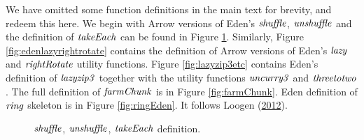 \documentclass[paper=A4,twoside=true,openright,parskip=full,chapterprefix=true,headings=normal,bibliography=totoc,listof=totoc,titlepage=on,captions=tableabove,draft=false,british]{scrreprt}%
\begin{document}
\label{app:omitted}

We have omitted some function definitions in the main text for brevity,
and redeem this here.
We begin with Arrow versions of Eden's \ensuremath{\Varid{shuffle}}, \ensuremath{\Varid{unshuffle}} and the
definition of \ensuremath{\Varid{takeEach}} can be found in Figure
\ref{fig:edenshuffleetc}. Similarly, Figure
\ref{fig:edenlazyrightrotate} contains the definition of Arrow versions
of Eden's \ensuremath{\Varid{lazy}} and \ensuremath{\Varid{rightRotate}} utility functions. Figure
\ref{fig:lazyzip3etc} contains Eden's definition of \ensuremath{\Varid{lazyzip3}} together
with the utility functions \ensuremath{\Varid{uncurry3}} and \ensuremath{\Varid{threetotwo}}. The full
definition of \ensuremath{\Varid{farmChunk}} is in Figure \ref{fig:farmChunk}. Eden
definition of \ensuremath{\Varid{ring}} skeleton is in Figure \ref{fig:ringEden}. It
follows Loogen (\protect\hyperlink{ref-Loogen2012}{2012}).

\begin{figure}[H]
\centering
{}\resethooks
\caption{\ensuremath{\Varid{shuffle}}, \ensuremath{\Varid{unshuffle}}, \ensuremath{\Varid{takeEach}} definition.}\label{fig:edenshuffleetc}\end{figure}
\end{document}
